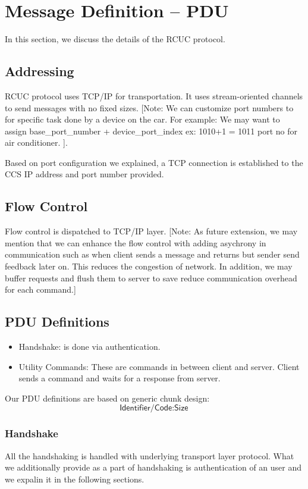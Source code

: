 \section{Message Definition -- PDU}
\label{sec:pdus}

In this section, we discuss the details of the \textsf{RCUC} protocol.

\subsection{Addressing}
\label{sec:pdus:addr}
\textsf{RCUC} protocol uses TCP/IP for transportation. It uses stream-oriented channels to send messages with no fixed sizes. [Note: We can customize port numbers to for specific task done by a device on the car. For example: We may want to assign base\_port\_number + device\_port\_index ex: 1010+1 = 1011 port no for air conditioner. ].

Based on port configuration we explained, a TCP connection is established to the \textsf{CCS} IP address and port number provided.
\subsection{Flow Control}
\label{sec:pdus:flow}
Flow control is dispatched to TCP/IP layer. [Note: As future extension, we may mention that we can enhance the flow control with adding asychrony in communication such as when client sends a message  and returns but sender send feedback later on. This reduces the congestion of network. In addition, we may buffer requests and flush them to server to save reduce communication overhead for each command.]
 
\subsection{PDU Definitions}
\label{sec:pdus:pdu}
\begin{itemize}
\item \textsf{Handshake}: is done via authentication.
\item \textsf{Utility Commands}: These are commands in between client and server. Client sends a command and waits for a response from server.
  \end{itemize}

Our PDU definitions are based on generic chunk design:
\[\textsf{Identifier/Code} : \textsf{Size}\]


\subsubsection{Handshake}
\label{sec:pdus:pdu:hs}
All the handshaking is handled with underlying transport layer protocol. What we additionally provide as a part of handshaking is authentication of an user and we expalin it in the following sections.
